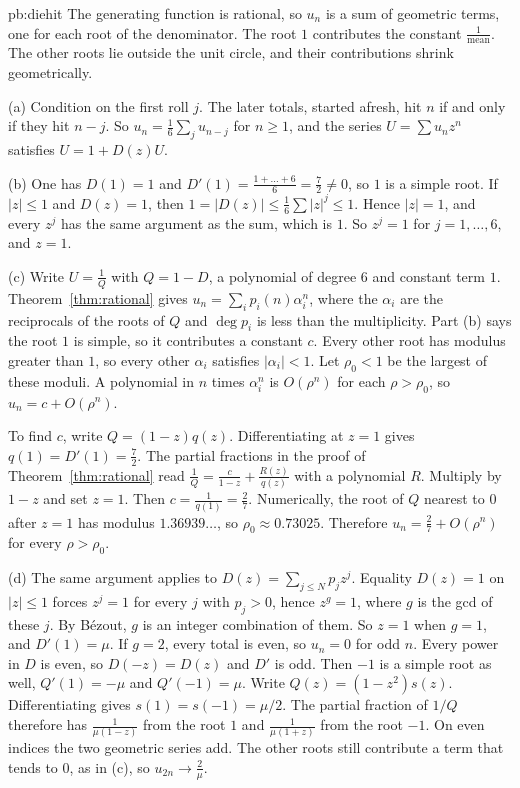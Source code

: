 \begin{solution}{pb:diehit}
\idea The generating function is rational, so $u_n$ is a sum of geometric terms, one for each root of the denominator. The root $1$ contributes the constant $\frac1{\text{mean}}$. The other roots lie outside the unit circle, and their contributions shrink geometrically.

\writeup (a) Condition on the first roll $j$. The later totals, started afresh, hit $n$ if and only if they hit $n-j$. So $u_n=\frac16\sum_ju_{n-j}$ for $n\ge1$, and the series $U=\sum u_nz^n$ satisfies
$U=1+D(z)U$.

(b) One has $D(1)=1$ and $D'(1)=\frac{1+\dots+6}6=\frac72\ne0$, so $1$ is a simple root. If $|z|\le1$ and $D(z)=1$, then $1=|D(z)|\le\frac16\sum|z|^j\le1$. Hence $|z|=1$, and every $z^j$ has the same argument
as the sum, which is $1$. So $z^j=1$ for $j=1,\dots,6$, and $z=1$.

(c) Write $U=\frac1Q$ with $Q=1-D$, a polynomial of degree $6$ and constant term $1$. Theorem~\ref{thm:rational} gives $u_n=\sum_ip_i(n)\alpha_i^n$, where the $\alpha_i$ are the reciprocals of the
roots of $Q$ and $\deg p_i$ is less than the multiplicity. Part (b) says the root $1$ is simple, so it contributes a constant $c$. Every other root has modulus greater than $1$, so every
other $\alpha_i$ satisfies $|\alpha_i|<1$. Let $\rho_0<1$ be the largest of these moduli. A polynomial in $n$ times $\alpha_i^n$ is $O(\rho^n)$ for each $\rho>\rho_0$, so $u_n=c+O(\rho^n)$.

To find $c$, write $Q=(1-z)q(z)$. Differentiating at $z=1$ gives $q(1)=D'(1)=\frac72$. The partial fractions in the proof of Theorem~\ref{thm:rational} read
$\frac1Q=\frac c{1-z}+\frac{R(z)}{q(z)}$ with a polynomial $R$. Multiply by $1-z$ and set $z=1$. Then $c=\frac1{q(1)}=\frac27$. Numerically, the root of $Q$ nearest to $0$ after $z=1$ has
modulus $1.36939\ldots$, so $\rho_0\approx0.73025$. Therefore $u_n=\frac27+O(\rho^n)$ for every $\rho>\rho_0$.

(d) The same argument applies to $D(z)=\sum_{j\le N}p_jz^j$. Equality $D(z)=1$ on $|z|\le1$ forces $z^j=1$ for every $j$ with $p_j>0$, hence $z^g=1$, where $g$ is the gcd of these $j$. By B\'ezout, $g$ is an integer
combination of them. So $z=1$ when $g=1$, and $D'(1)=\mu$. If $g=2$, every total is even, so $u_n=0$ for odd $n$. Every power in $D$ is even, so $D(-z)=D(z)$ and $D'$ is odd. Then $-1$ is a simple root as well, $Q'(1)=-\mu$ and $Q'(-1)=\mu$. Write $Q(z)=(1-z^2)s(z)$. Differentiating gives $s(1)=s(-1)=\mu/2$. The partial fraction of $1/Q$ therefore has $\frac1{\mu(1-z)}$ from the root $1$ and $\frac1{\mu(1+z)}$ from the root $-1$. On even indices the two geometric series add. The other roots still contribute a term that tends to $0$, as in (c), so $u_{2n}\to\frac2\mu$.


\end{solution}
